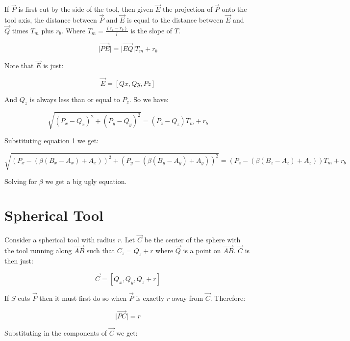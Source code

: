 \documentclass{article}
\newcommand{\norm}[1]{\lvert #1 \rvert}
\begin{document}
If $\vec{P}$ is first cut by the side of the tool, then given $\vec{E}$ the
projection of $\vec{P}$ onto the tool axis, the distance between $\vec{P}$ and
$\vec{E}$ is equal to the distance between $\vec{E}$ and $\vec{Q}$ times $T_m$
plus $r_b$.  Where $T_m=\frac{(r_t - r_b)}{l}$ is the slope of $T$.

\begin{equation*}
\norm{\vec{PE}} = \norm{\vec{EQ}} T_m + r_b
\end{equation*}

Note that $\vec{E}$ is just:

\begin{equation*}
\vec{E} = [Qx, Qy, Pz]
\end{equation*}

And $Q_z$ is always less than or equal to $P_z$.  So we have:

\begin{equation}\label{eq2}
\sqrt{(P_x - Q_x)^2 + (P_y - Q_y)^2} = (P_z - Q_z) T_m + r_b
\end{equation}

Substituting equation 1 we get:

\begin{equation*}
\sqrt{(P_x - (\beta (B_x-A_x) + A_x))^2 + (P_y - (\beta (B_y-A_y) + A_y))^2} =
(P_z - (\beta (B_z - A_z) + A_z)) T_m + r_b
\end{equation*}

Solving for $\beta$ we get a big ugly equation.

\section{Spherical Tool}
Consider a spherical tool with radius $r$.  Let $\vec{C}$ be the center of the
sphere with the tool running along $\vec{AB}$ such that $C_z = Q_z + r$ where
$\vec{Q}$ is a point on $\vec{AB}$.  $\vec{C}$ is then just:

\begin{equation*}
\vec{C} = [Q_x, Q_y, Q_z+r]
\end{equation*}

If $S$ cuts $\vec{P}$ then it must first do so when $\vec{P}$ is exactly $r$
away from $\vec{C}$.  Therefore:

\begin{equation*}
\norm{\vec{PC}} = r
\end{equation*}

Substituting in the components of $\vec{C}$ we get:
\end{document}

